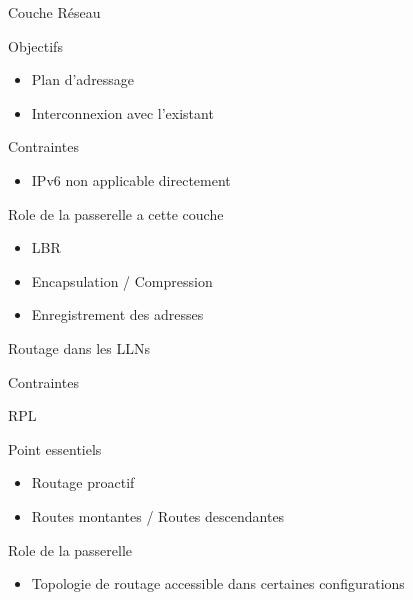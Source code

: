 \begin{frame}{Couche Réseau}
  \begin{block}{Objectifs}
    \begin{itemize}
      \item Plan d'adressage
      \item Interconnexion avec l'existant
    \end{itemize}
  \end{block}

  \begin{block}{Contraintes}
    \begin{itemize}
      \item IPv6 non applicable directement
    \end{itemize}
  \end{block}

  \begin{block}{Role de la passerelle a cette couche}
    \begin{itemize}
      \item LBR
      \item Encapsulation / Compression
      \item Enregistrement des adresses
    \end{itemize}
  \end{block}


\end{frame}


\begin{frame}{Routage dans les LLNs}
  \begin{block}{Contraintes}
    
  \end{block}
\end{frame}

\begin{frame}{RPL}
  \begin{block}{Point essentiels}
    \begin{itemize}
      \item Routage proactif
      \item Routes montantes / Routes descendantes
    \end{itemize}
  \end{block}

  \begin{block}{Role de la passerelle}
    \begin{itemize}
      \item Topologie de routage accessible dans certaines configurations
    \end{itemize}
  \end{block}
\end{frame}

